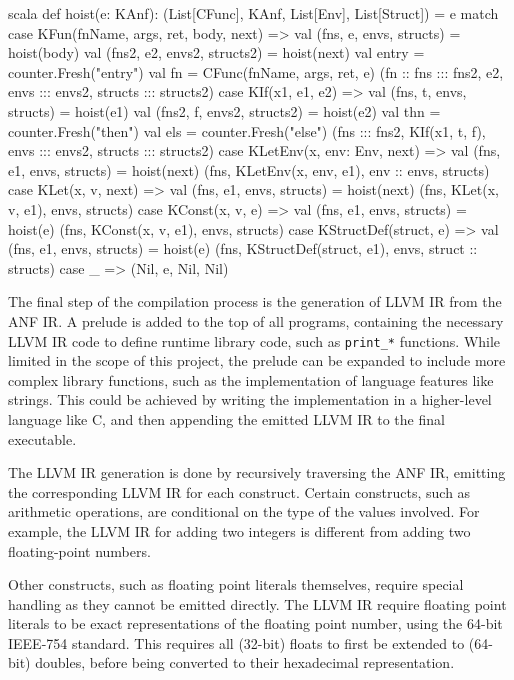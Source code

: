 \begin{code}{scala}
    def hoist(e: KAnf): (List[CFunc], KAnf, List[Env], List[Struct]) = e match {
        case KFun(fnName, args, ret, body, next) => {
            val (fns, e, envs, structs) = hoist(body)
            val (fns2, e2, envs2, structs2) = hoist(next)
            val entry = counter.Fresh("entry")
            val fn = CFunc(fnName, args, ret, e)
            (fn :: fns ::: fns2, e2, envs ::: envs2, structs ::: structs2)
        }
        case KIf(x1, e1, e2) => {
            val (fns, t, envs, structs) = hoist(e1)
            val (fns2, f, envs2, structs2) = hoist(e2)
            val thn = counter.Fresh("then")
            val els = counter.Fresh("else")
            (fns ::: fns2, KIf(x1, t, f), envs ::: envs2, structs ::: structs2)
        }
        case KLetEnv(x, env: Env, next) => {
            val (fns, e1, envs, structs) = hoist(next)
            (fns, KLetEnv(x, env, e1), env :: envs, structs)
        }
        case KLet(x, v, next) => {
            val (fns, e1, envs, structs) = hoist(next)
            (fns, KLet(x, v, e1), envs, structs)
        }
        case KConst(x, v, e) => {
            val (fns, e1, envs, structs) = hoist(e)
            (fns, KConst(x, v, e1), envs, structs)
        }
        case KStructDef(struct, e) => {
            val (fns, e1, envs, structs) = hoist(e)
            (fns, KStructDef(struct, e1), envs, struct :: structs)
        }
        case _ => (Nil, e, Nil, Nil)
    }
\end{code}

The final step of the compilation process is the generation of LLVM IR from the ANF IR\@. A prelude
is added to the top of all programs, containing the necessary LLVM IR code to define runtime library
code, such as \texttt{print_*} functions. While limited in the scope of this project, the prelude
can be expanded to include more complex library functions, such as the implementation of language
features like strings. This could be achieved by writing the implementation in a higher-level
language like C, and then appending the emitted LLVM IR to the final executable.

The LLVM IR generation is done by recursively traversing the ANF IR, emitting the corresponding LLVM
IR for each construct. Certain constructs, such as arithmetic operations, are conditional on the
type of the values involved. For example, the LLVM IR for adding two integers is different from
adding two floating-point numbers.

Other constructs, such as floating point literals themselves, require special handling as they
cannot be emitted directly. The LLVM IR require floating point literals to be exact representations
of the floating point number, using the 64-bit IEEE-754 standard. This requires all (32-bit) floats
to first be extended to (64-bit) doubles, before being converted to their hexadecimal
representation.

